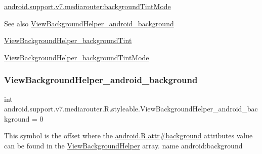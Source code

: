 {\ttfamily \hyperlink{classandroid_1_1support_1_1v7_1_1mediarouter_1_1R_1_1styleable_a61f31935344280c75bfeb7fe5e2b0794}{android.\+support.\+v7.\+mediarouter\+:background\+Tint\+Mode}}

\begin{DoxySeeAlso}{See also}
\hyperlink{classandroid_1_1support_1_1v7_1_1mediarouter_1_1R_1_1styleable_ac2f353ef7ddd44600660b357e4075019}{View\+Background\+Helper\+\_\+android\+\_\+background} 

\hyperlink{classandroid_1_1support_1_1v7_1_1mediarouter_1_1R_1_1styleable_a257b269be5ac880e08242d049999f16c}{View\+Background\+Helper\+\_\+background\+Tint} 

\hyperlink{classandroid_1_1support_1_1v7_1_1mediarouter_1_1R_1_1styleable_a61f31935344280c75bfeb7fe5e2b0794}{View\+Background\+Helper\+\_\+background\+Tint\+Mode} 
\end{DoxySeeAlso}
\mbox{\label{classandroid_1_1support_1_1v7_1_1mediarouter_1_1R_1_1styleable_ac2f353ef7ddd44600660b357e4075019}} 
\subsubsection{\texorpdfstring{View\+Background\+Helper\+\_\+android\+\_\+background}{ViewBackgroundHelper\_android\_background}}
{\footnotesize\ttfamily int android.\+support.\+v7.\+mediarouter.\+R.\+styleable.\+View\+Background\+Helper\+\_\+android\+\_\+background = 0\hspace{0.3cm}{\ttfamily [static]}}

This symbol is the offset where the \hyperlink{}{android.\+R.\+attr\#background} attribute\textquotesingle{}s value can be found in the \hyperlink{classandroid_1_1support_1_1v7_1_1mediarouter_1_1R_1_1styleable_a65c1a920f4419d63dca1770bf1dd35ca}{View\+Background\+Helper} array.  name android\+:background \mbox{\label{classandroid_1_1support_1_1v7_1_1mediarouter_1_1R_1_1styleable_a257b269be5ac880e08242d049999f16c}} 
